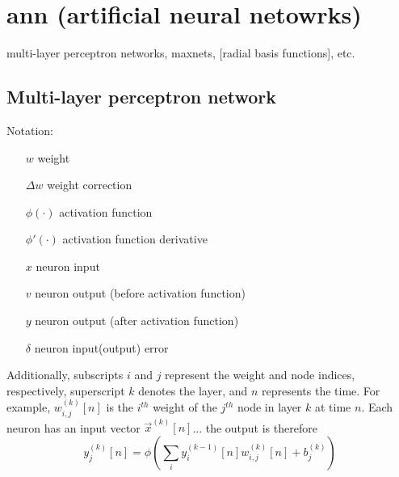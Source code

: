 % 
%

\section{ann (artificial neural netowrks)}
multi-layer perceptron networks, maxnets, [radial basis functions], etc.

\subsection{Multi-layer perceptron network}

Notation:
\begin{itemize}
    \item[$w$] weight
    \item[$\Delta w$] weight correction
    \item[$\phi(\cdot)$] activation function
    \item[$\phi'(\cdot)$] activation function derivative
    \item[$x$] neuron input
    \item[$v$] neuron output (before activation function)
    \item[$y$] neuron output (after activation function)
    \item[$\delta$] neuron input(output) error
\end{itemize}
Additionally, subscripts $i$ and $j$ represent the weight and node indices,
respectively, superscript $k$ denotes the layer, and $n$ represents the time.
For example, $w_{i,j}^{(k)}[n]$ is the $i^{th}$ weight of the $j^{th}$ node in
layer $k$ at time $n$.
Each neuron has an input vector $\vec{x}^{(k)}[n]$...
the output is therefore
\[
    y_j^{(k)}[n] = \phi\left( \sum_{i}{y_{i}^{(k-1)}[n] w_{i,j}^{(k)}[n]} + b_{j}^{(k)} \right)
\]
